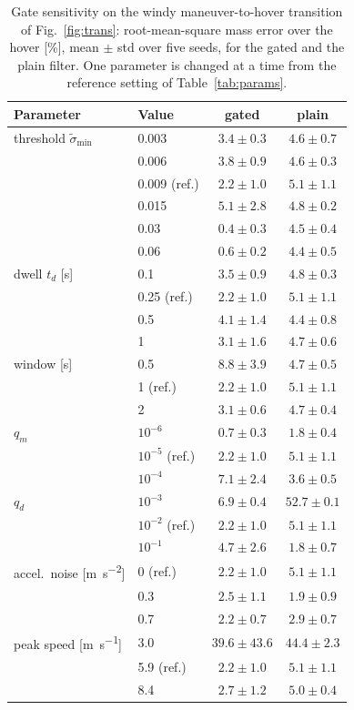\documentclass{ieeeaccess}
\begin{document}
\begin{table}[t]\color{blue}
\centering
\caption{Gate sensitivity on the windy maneuver-to-hover transition of
Fig.~\ref{fig:trans}: root-mean-square mass error over the hover [\si{\percent}],
mean $\pm$ std over five seeds, for the gated and the plain filter. One parameter
is changed at a time from the reference setting of Table~\ref{tab:params}.}
\label{tab:sens}
\setlength{\tabcolsep}{4pt}
\begin{tabular}{llcc}
\toprule
Parameter & Value & gated & plain \\
\midrule
threshold $\tilde\sigma_{\min}$ & 0.003 & $3.4\pm0.3$ & $4.6\pm0.7$ \\
 & 0.006 & $3.8\pm0.9$ & $4.6\pm0.3$ \\
 & 0.009 (ref.) & $2.2\pm1.0$ & $5.1\pm1.1$ \\
 & 0.015 & $5.1\pm2.8$ & $4.8\pm0.2$ \\
 & 0.03 & $0.4\pm0.3$ & $4.5\pm0.4$ \\
 & 0.06 & $0.6\pm0.2$ & $4.4\pm0.5$ \\
\midrule
dwell $t_d$ [\si{\second}] & 0.1 & $3.5\pm0.9$ & $4.8\pm0.3$ \\
 & 0.25 (ref.) & $2.2\pm1.0$ & $5.1\pm1.1$ \\
 & 0.5 & $4.1\pm1.4$ & $4.4\pm0.8$ \\
 & 1 & $3.1\pm1.6$ & $4.7\pm0.6$ \\
\midrule
window [\si{\second}] & 0.5 & $8.8\pm3.9$ & $4.7\pm0.5$ \\
 & 1 (ref.) & $2.2\pm1.0$ & $5.1\pm1.1$ \\
 & 2 & $3.1\pm0.6$ & $4.7\pm0.4$ \\
\midrule
$q_m$ & $10^{-6}$ & $0.7\pm0.3$ & $1.8\pm0.4$ \\
 & $10^{-5}$ (ref.) & $2.2\pm1.0$ & $5.1\pm1.1$ \\
 & $10^{-4}$ & $7.1\pm2.4$ & $3.6\pm0.5$ \\
\midrule
$q_d$ & $10^{-3}$ & $6.9\pm0.4$ & $52.7\pm0.1$ \\
 & $10^{-2}$ (ref.) & $2.2\pm1.0$ & $5.1\pm1.1$ \\
 & $10^{-1}$ & $4.7\pm2.6$ & $1.8\pm0.7$ \\
\midrule
accel.\ noise [\si{\meter\per\square\second}] & 0 (ref.) & $2.2\pm1.0$ & $5.1\pm1.1$ \\
 & 0.3 & $2.5\pm1.1$ & $1.9\pm0.9$ \\
 & 0.7 & $2.2\pm0.7$ & $2.9\pm0.7$ \\
\midrule
peak speed [\si{\meter\per\second}] & 3.0 & $39.6\pm43.6$ & $44.4\pm2.3$ \\
 & 5.9 (ref.) & $2.2\pm1.0$ & $5.1\pm1.1$ \\
 & 8.4 & $2.7\pm1.2$ & $5.0\pm0.4$ \\
\bottomrule
\end{tabular}
\end{table}
\end{document}
